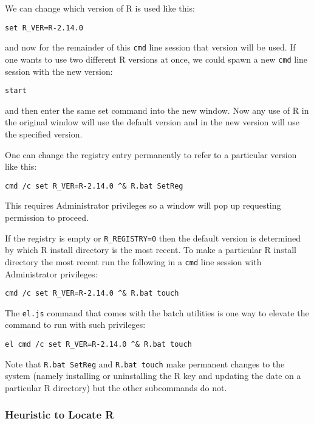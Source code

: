 We can change which version of R is used like this:

\begin{verbatim}
set R_VER=R-2.14.0
\end{verbatim}

and now for the remainder of this \texttt{cmd} line session that version
will be used. If one wants to use two different R versions at once, we
could spawn a new \texttt{cmd} line session with the new version:

\begin{verbatim}
start
\end{verbatim}

and then enter the same set command into the new window. Now any use of
R in the original window will use the default version and in the new
version will use the specified version.

One can change the registry entry permanently to refer to a particular
version like this:

\begin{verbatim}
cmd /c set R_VER=R-2.14.0 ^& R.bat SetReg
\end{verbatim}

This requires Administrator privileges so a window will pop up
requesting permission to proceed.

If the registry is empty or \texttt{R\_REGISTRY=0} then the default
version is determined by which R install directory is the most recent.
To make a particular R install directory the most recent run the
following in a \texttt{cmd} line session with Administrator privileges:

\begin{verbatim}
cmd /c set R_VER=R-2.14.0 ^& R.bat touch
\end{verbatim}

The \texttt{el.js} command that comes with the batch utilities is one
way to elevate the command to run with such privileges:

\begin{verbatim}
el cmd /c set R_VER=R-2.14.0 ^& R.bat touch
\end{verbatim}

Note that \texttt{R.bat SetReg} and \texttt{R.bat touch} make permanent
changes to the system (namely installing or uninstalling the R key and
updating the date on a particular R directory) but the other subcommands
do not.

\subsubsection{Heuristic to Locate R}


